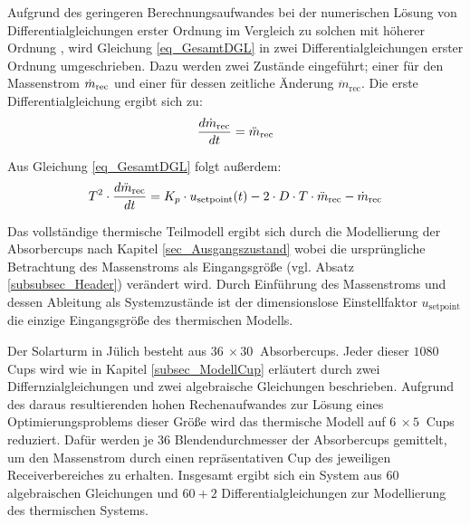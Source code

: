 Aufgrund des geringeren Berechnungsaufwandes bei der numerischen Lösung von Differentialgleichungen erster Ordnung im Vergleich zu solchen mit höherer Ordnung \cite[S.138-139]{Gausch}\cite[S.241ff]{Howell}, wird Gleichung \ref{eq_GesamtDGL} in zwei Differentialgleichungen erster Ordnung umgeschrieben.
Dazu werden zwei Zustände eingeführt; einer für den Massenstrom $\dot{m}_{\mathrm{rec}}$ und einer für dessen zeitliche Änderung $\ddot{m}_{\mathrm{rec}}$.
Die erste Differentialgleichung ergibt sich zu:
\begin{equation} \label{eq_ErsteDGLMassflow}
    \frac{d\dot{m}_{\mathrm{rec}}}{dt} = \ddot{m}_{\mathrm{rec}}
\end{equation}

Aus Gleichung \ref{eq_GesamtDGL} folgt außerdem:
\begin{equation} \label{eq_ZweiteDGLMassflow}
    T^2 \cdot \frac{d\ddot{m}_{\mathrm{rec}}}{dt} = K_p\cdot u_{\mathrm{setpoint}}(t) - 2 \cdot D \cdot T \cdot \ddot{m}_{\mathrm{rec}} - \dot{m}_{\mathrm{rec}}
\end{equation}

Das vollständige thermische Teilmodell ergibt sich durch die Modellierung der Absorbercups nach Kapitel \ref{sec_Ausgangszustand} wobei die ursprüngliche Betrachtung des Massenstroms als Eingangsgröße (vgl. Absatz \ref{subsubsec_Header}) verändert wird.
Durch Einführung des Massenstroms und dessen Ableitung als Systemzustände ist der dimensionslose Einstellfaktor $u_{\mathrm{setpoint}}$ die einzige Eingangsgröße des thermischen Modells.

Der Solarturm in Jülich besteht aus $\SI{36}{} \times \SI{30}{}$ Absorbercups.
Jeder dieser $1080$ Cups wird wie in Kapitel \ref{subsec_ModellCup} erläutert durch zwei Differnzialgleichungen und zwei algebraische Gleichungen beschrieben.
Aufgrund des daraus resultierenden hohen Rechenaufwandes zur Lösung eines Optimierungsproblems dieser Größe wird das thermische Modell auf $\SI{6}{} \times \SI{5}{}$ Cups reduziert.
Dafür werden je $36$ Blendendurchmesser der Absorbercups gemittelt, um den Massenstrom durch einen repräsentativen Cup des jeweiligen Receiverbereiches zu erhalten.
Insgesamt ergibt sich ein System aus $60$ algebraischen Gleichungen und $60+2$ Differentialgleichungen zur Modellierung des thermischen Systems.




